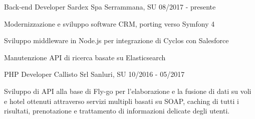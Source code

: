 

\begin{cventries}

  \cventry
    {Back-end Developer} %
    {Sardex Spa} %
    {Serrammana, SU} %
    {08/2017 - presente} %
    {
      \begin{cvitems} %
        \item {Modernizzazione e sviluppo software CRM, porting verso Symfony 4}
        \item {Sviluppo middleware in Node.js per integrazione di Cyclos con Salesforce}
        \item {Manutenzione API di ricerca basate su Elasticsearch}
      \end{cvitems}
    }

  \cventry
    {PHP Developer} %
    {Callisto Srl} %
    {Sanluri, SU} %
    {10/2016 - 05/2017} %
    {
      \begin{cvitems} %
        \item {Sviluppo di API alla base di Fly-go per l’elaborazione e la fusione di dati su voli e hotel ottenuti attraverso servizi multipli basati su SOAP, caching di tutti i risultati, prenotazione e trattamento di informazioni delicate degli utenti.}
      \end{cvitems}
    }

\end{cventries}
